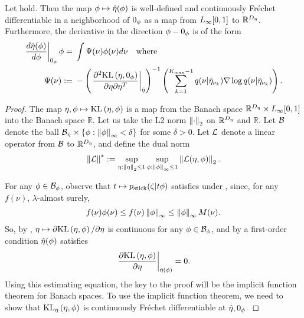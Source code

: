 \begin{thm}
%
Let  hold. Then the map $\phi \mapsto
\hat\eta(\phi)$ is well-defined and continuously Fr{\'e}chet differentiable in a
neighborhood of $0_\phi$ as a map from ${L_{\infty}[0,1]}$ to $\mathbb{R}^{D_{\eta}}$.
Furthermore, the derivative in the direction $\phi - 0_\phi$ is of the form
%
\begin{align*}
%
\fracat{d \etaopt(\phi)}{d\phi}{\phiz} \phi ={}&
    \int \infl(\nu) \phi(\nu) d\nu \mathtxt{where} \\
%
\infl(\nu) :={}&
-\left(\fracat{\partial^2 \KL{\eta, \phiz}}
                {\partial \eta \partial \eta^T}
                {\etaopt}\right)^{-1}
\left(
    \sumkm
    \q(\nu \vert \etaoptnuk)
    \nabla \log \q(\nu \vert \etaoptnuk)
\right).
%
\end{align*}
%

%

\begin{proof}
%
The map $\eta, \phi \mapsto \mathrm{KL}\left(\eta, \phi\right)$ is a map from the Banach space
$\mathbb{R}^{D_{\eta}} \times {L_{\infty}[0,1]}$ into the Banach space $\mathbb{R}$. Let us
take the L2 norm $\left\Vert\cdot\right\Vert_2$ on $\mathbb{R}^{{D_{\eta}}}$ and $\mathbb{R}$.
Let $\mathcal{B}$ denote the ball $\mathcal{B}_\eta \times \{ \phi: \left\Vert\phi\right\Vert_{\infty} <
\delta\}$ for some $\delta > 0$.  Let $\mathcal{L}$ denote a linear operator from
$\mathcal{B}$ to $\mathbb{R}^{D_{\eta}}$, and define the dual norm
%
\begin{align*}
%
\norm{\linop}^* :=
    \sup_{\eta: \norm{\eta}_2 \le 1} \sup_{\phi: \norminf{\phi} \le 1}
     \norm{\linop(\eta, \phi)}_2.
%
\end{align*}

For any $\phi \in \mathcal{B}_\phi$, observe that $t \mapsto p_{\mathrm{stick}}(\zeta \vert t
\phi)$ satisfies  under ,
since, for any $f(\nu)$, $\lambda$-almost surely,
%
\begin{align*}
%
f(\nu) \phi(\nu) \le f(\nu) \norminf{\phi} \le \norminf{\phi} M(\nu).
%
\end{align*}
%
So, by , $\eta \mapsto \partial \mathrm{KL}\left(\eta, \phi\right) /
\partial \eta$ is continuous for any $\phi \in \mathcal{B}_\phi$, and by a first-order
condition $\hat\eta(\phi)$ satisfies
%
\begin{align*}
%
\fracat{\partial \KL{\eta, \phi}}
                {\partial \eta}
                {\etaopt(\phi)} = 0.
%
\end{align*}
%
Using this estimating equation, the key to the proof will be the implicit
function theorem for Banach spaces. To use the implicit function theorem, we
need to show that $\mathrm{KL}_{\eta}\left(\eta, \phi\right)$ is continuously Fr{\'e}chet
differentiable at $\hat\eta, 0_\phi$.


\end{proof}
\end{thm}
